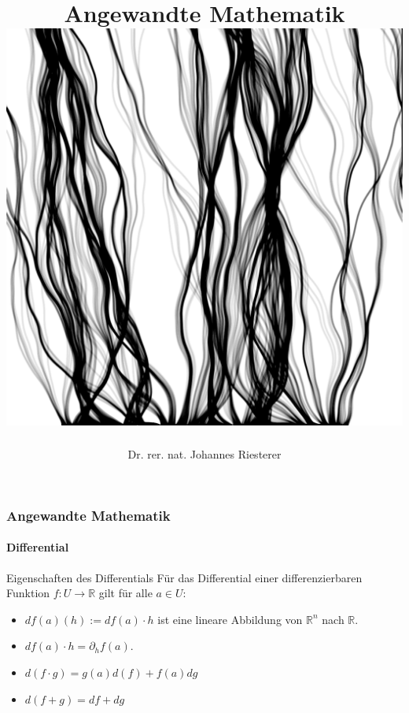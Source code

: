 \documentclass{beamer}
\begin{document}
\title[Angewandte Mathematik] %
{Angewandte Mathematik
\\
\includegraphics[scale=0.15]{images/cover}
}
\subtitle{}
\author[Dr. Johannes Riesterer] %
{Dr.  rer. nat. Johannes Riesterer}

\date[KPT 2004] %
{}

\subject{Angewandte Mathematik}



\frame{\titlepage}

\begin{frame}
    \frametitle{Angewandte Mathematik}
\framesubtitle{Differential}
    \begin{block}{Eigenschaften des Differentials}
Für das Differential einer differenzierbaren Funktion  $f: U \to \mathbb{R}$ gilt für alle $a \in U$:
\begin{itemize}
\item  $df(a) (h) :=  df(a) \cdot h$ ist eine lineare Abbildung von $\mathbb{R}^n$ nach $\mathbb{R}$.
\item $df(a)  \cdot h = \partial_h f(a)$. 
\item $d (f \cdot g) = g(a) d(f) + f(a) dg$
\item $d(f + g) = df + dg$
\end{itemize}
\end{block}
 \end{frame}
\end{document}
